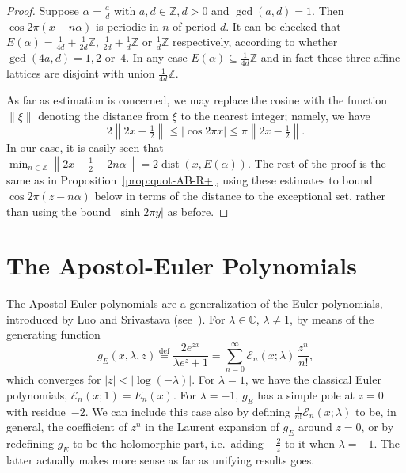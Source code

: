 \documentclass[11pt,a4paper]{amsart}
\newcommand{\Z}{\mathbb{Z}}
\newcommand{\C}{\mathbb{C}}
\newcommand{\E}{\mathcal{E}}
\newcommand{\dist}{\operatorname{dist}}
\newcommand{\eqdef}{\overset{\mathrm{def}}{=}}
\theoremstyle{plain}
\theoremstyle{remark}
\begin{document}
\begin{proof}
Suppose $\alpha = \frac{a}{d}$ with $a,d \in \Z, d > 0$ and $\gcd(a,d)=1$. Then $\cos 2\pi(x - n\alpha)$ is periodic in $n$ of period $d$.
It can be checked that $E(\alpha) = \frac{1}{4d} + \frac{1}{2d}\Z$, $\frac{1}{2d} + \frac{1}{d} \Z$ or $\frac{1}{d} \Z$ respectively, according to whether $\gcd(4a,d) = 1,2$ or~$4$. In any case $E(\alpha) \subseteq \frac{1}{4d} \Z$
and in fact these three affine lattices are disjoint with union $\frac{1}{4d}\Z$.

As far as estimation is concerned, we may replace the cosine with the function 
$\|\xi\|$ denoting the distance from $\xi$ to the nearest integer; namely, we have
$$
		     2 \left\|2x -\tfrac{1}{2} \right\|
		\leq |\cos 2\pi x|
		\leq \pi \left\|2x -\tfrac{1}{2} \right\|.
$$
In our case, it is easily seen that
$
	  \min_{n \in \Z} \left\| 2x - \tfrac{1}{2} - 2n \alpha \right\|
	= 2\dist(x,E(\alpha)).
$
The rest of the proof is the same as in Proposition~\ref{prop:quot-AB-R+}, using these estimates to bound
$\cos 2\pi(z - n\alpha)$ below in terms of the distance to the exceptional set, rather than using the bound 
$|\sinh 2\pi y|$ as before.
\end{proof}



\section{The Apostol-Euler Polynomials}
\label{sec:ApostolEuler}




The Apostol-Euler polynomials are a generalization of the Euler polynomials, introduced by Luo and Srivastava (see~\cite{Luo-Tai,LuoSri}). For $\lambda \in \C$, $\lambda \neq 1$, by means of the generating function
%
\begin{equation}
\label{eq:GF-AE}
	     g_{E}(x,\lambda,z)
  \eqdef \frac{2 e^{zx}}{\lambda e^z+1}
  =      \sum_{n=0}^\infty \E_n(x;\lambda)\, \frac{z^n}{n!},
\end{equation}
%
which converges for $|z| < |\log(-\lambda)|.$ 
For $\lambda = 1$, we have the classical Euler polynomials, $\E_{n}(x;1) = E_{n}(x)$.
For $\lambda = -1$, $g_{E}$ has a simple pole at $z = 0$ with residue~$-2$. We can include this case also by defining $\frac{1}{n!}\E_{n}(x;\lambda)$ to be, in general, the coefficient of 
$z^{n}$ in the Laurent expansion of $g_{E}$ around $z=0$, or by redefining $g_{E}$ to be the holomorphic part, i.e.\ adding $-\frac{2}{z}$ to it when $\lambda = -1$. The latter actually makes more sense as far as unifying results goes.
\end{document}
